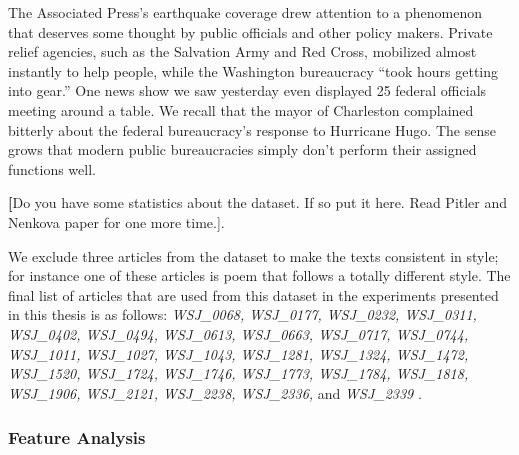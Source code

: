 \begin{examples}
	\label{ex:wsj-1818}
	The Associated Press's earthquake coverage drew attention to a phenomenon that deserves some thought by public officials and other policy makers. 
	Private relief agencies, such as the Salvation Army and Red Cross, mobilized almost instantly to help people, while the Washington bureaucracy ``took hours getting into gear.'' 
	One news show we saw yesterday even displayed 25 federal officials meeting around a table. 
	We recall that the mayor of Charleston complained bitterly about the federal bureaucracy's response to Hurricane Hugo. 
	The sense grows that modern public bureaucracies simply don't perform their assigned functions well. 
\end{examples}

\textbf[Do you have some statistics about the dataset. If so put it here. Read Pitler and Nenkova paper for one more time.].

We exclude three articles from the dataset to make the texts consistent in style; for instance one of these articles is poem that follows a totally different style. 
The final list of articles that are used from this dataset in the experiments presented in this thesis is as follows:
\emph{
WSJ\_0068,
WSJ\_0177,
WSJ\_0232,
WSJ\_0311,
WSJ\_0402,
WSJ\_0494,
WSJ\_0613,
WSJ\_0663,
WSJ\_0717,
WSJ\_0744,
WSJ\_1011,
WSJ\_1027,
WSJ\_1043,
WSJ\_1281,
WSJ\_1324,
WSJ\_1472,
WSJ\_1520,
WSJ\_1724,
WSJ\_1746,
WSJ\_1773,
WSJ\_1784,
WSJ\_1818,
WSJ\_1906,
WSJ\_2121,
WSJ\_2238,
WSJ\_2336,
} and 
\emph{
WSJ\_2339
}.


\subsubsection{Feature Analysis}

